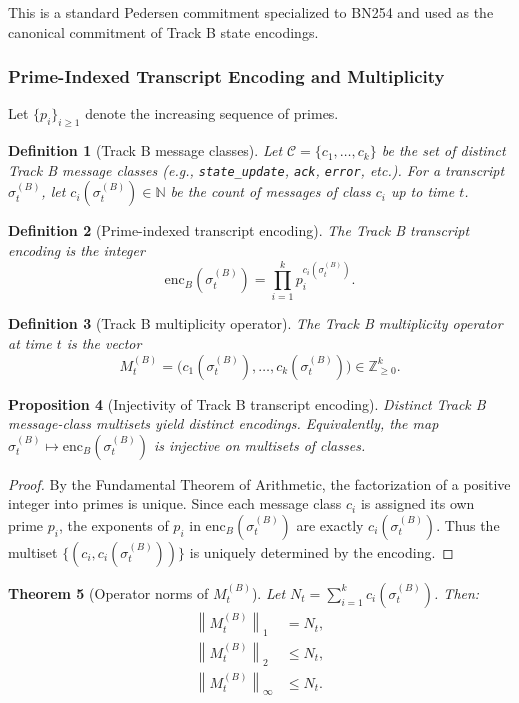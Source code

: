 \documentclass[11pt]{article}
\newtheorem{definition}{Definition}[section]
\newtheorem{theorem}[definition]{Theorem}
\newtheorem{proposition}[definition]{Proposition}
\newcommand{\Z}{\mathbb{Z}}
\newcommand{\N}{\mathbb{N}}
\newcommand{\norm}[1]{\left\lVert #1 \right\rVert}
\begin{document}
This is a standard Pedersen commitment specialized to BN254 and used as the canonical commitment of Track B state encodings.

\subsubsection{Prime-Indexed Transcript Encoding and Multiplicity}

Let \(\{p_i\}_{i \ge 1}\) denote the increasing sequence of primes.

\begin{definition}[Track B message classes]
Let \(\mathcal{C} = \{c_1, \dots, c_k\}\) be the set of distinct Track B message classes (e.g., \texttt{state\_update}, \texttt{ack}, \texttt{error}, etc.).
For a transcript \(\sigma_t^{(B)}\), let \(c_i(\sigma_t^{(B)}) \in \N\) be the count of messages of class \(c_i\) up to time \(t\).
\end{definition}

\begin{definition}[Prime-indexed transcript encoding]
The Track B transcript encoding is the integer
\[
  \mathrm{enc}_B(\sigma_t^{(B)}) = \prod_{i=1}^k p_i^{c_i(\sigma_t^{(B)})}.
\]
\end{definition}

\begin{definition}[Track B multiplicity operator]
The Track B multiplicity operator at time \(t\) is the vector
\[
  M_t^{(B)} = \bigl(c_1(\sigma_t^{(B)}), \dots, c_k(\sigma_t^{(B)})\bigr) \in \Z_{\ge 0}^k.
\]
\end{definition}

\begin{proposition}[Injectivity of Track B transcript encoding]
Distinct Track B message-class multisets yield distinct encodings.
Equivalently, the map
\(
\sigma_t^{(B)} \mapsto \mathrm{enc}_B(\sigma_t^{(B)})
\)
is injective on multisets of classes.
\end{proposition}

\begin{proof}
By the Fundamental Theorem of Arithmetic, the factorization of a positive integer into primes is unique.
Since each message class \(c_i\) is assigned its own prime \(p_i\), the exponents of \(p_i\) in \(\mathrm{enc}_B(\sigma_t^{(B)})\) are exactly \(c_i(\sigma_t^{(B)})\).
Thus the multiset \(\bigl\{(c_i, c_i(\sigma_t^{(B)}))\bigr\}\) is uniquely determined by the encoding.
\end{proof}

\begin{theorem}[Operator norms of \(M_t^{(B)}\)]
Let \(N_t = \sum_{i=1}^k c_i(\sigma_t^{(B)})\).
Then:
\begin{align*}
  \norm{M_t^{(B)}}_1 &= N_t, \\
  \norm{M_t^{(B)}}_2 &\le N_t, \\
  \norm{M_t^{(B)}}_\infty &\le N_t.
\end{align*}
\end{theorem}
\end{document}
